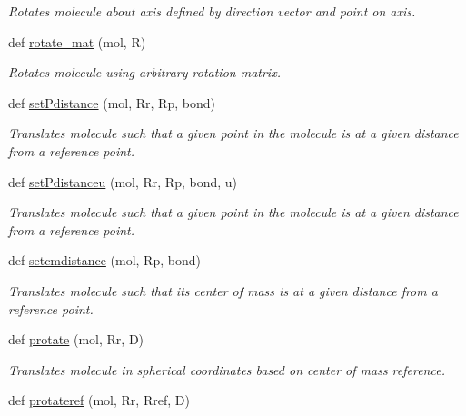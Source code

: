 \begin{DoxyCompactItemize}
\begin{DoxyCompactList}\small\item\em Rotates molecule about axis defined by direction vector and point on axis. \end{DoxyCompactList}\item 
def \hyperlink{namespacemolSimplify_1_1Scripts_1_1geometry_a9ae4203ba9ba1f04d2f2ba23b0515a8b}{rotate\+\_\+mat} (mol, R)
\begin{DoxyCompactList}\small\item\em Rotates molecule using arbitrary rotation matrix. \end{DoxyCompactList}\item 
def \hyperlink{namespacemolSimplify_1_1Scripts_1_1geometry_a5df8aae5c4383cfebd5d9a62eef388a5}{set\+Pdistance} (mol, Rr, Rp, bond)
\begin{DoxyCompactList}\small\item\em Translates molecule such that a given point in the molecule is at a given distance from a reference point. \end{DoxyCompactList}\item 
def \hyperlink{namespacemolSimplify_1_1Scripts_1_1geometry_a67598d5fb5cb3e55b1829298b62d9f46}{set\+Pdistanceu} (mol, Rr, Rp, bond, u)
\begin{DoxyCompactList}\small\item\em Translates molecule such that a given point in the molecule is at a given distance from a reference point. \end{DoxyCompactList}\item 
def \hyperlink{namespacemolSimplify_1_1Scripts_1_1geometry_a3ea4c34e0e07a3a92d31bd6b673a1fce}{setcmdistance} (mol, Rp, bond)
\begin{DoxyCompactList}\small\item\em Translates molecule such that its center of mass is at a given distance from a reference point. \end{DoxyCompactList}\item 
def \hyperlink{namespacemolSimplify_1_1Scripts_1_1geometry_ab942da4b95418e12716685e3abee16e5}{protate} (mol, Rr, D)
\begin{DoxyCompactList}\small\item\em Translates molecule in spherical coordinates based on center of mass reference. \end{DoxyCompactList}\item 
def \hyperlink{namespacemolSimplify_1_1Scripts_1_1geometry_a5f9b944e195ebf9c9997e1abc7d4fd74}{protateref} (mol, Rr, Rref, D)

\end{DoxyCompactItemize}

